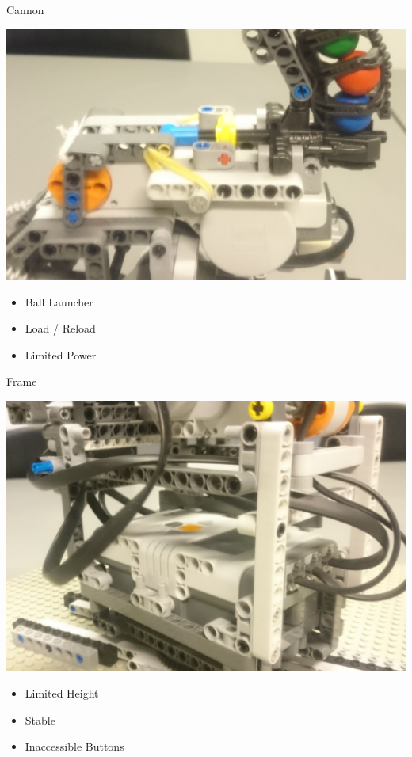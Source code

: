 \begin{frame}{Cannon}

\includegraphics[scale=0.15]{figures/CannonMech.JPG} 

\begin{itemize}
	\item Ball Launcher
	\item Load / Reload
	\item Limited Power
\end{itemize}
\end{frame}

\begin{frame}{Frame}

\includegraphics[scale=0.08]{figures/FrameMech.JPG} 

\begin{itemize}
	\item Limited Height
	\item Stable
	\item Inaccessible Buttons
\end{itemize}
\end{frame}

